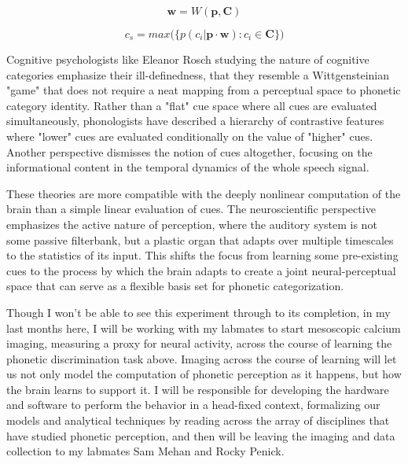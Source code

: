 \begin{equation}
\label{eqn:w}
\mathbf{w} = W(\mathbf{p}, \mathbf{C})
\end{equation}

\begin{equation}
\label{eqn:infer_2}
c_s = max\big( \big\{ p(c_i | \mathbf{p} \cdot \mathbf{w}) : c_i \in \mathbf{C} \big\}\big)
\end{equation}

Cognitive psychologists like Eleanor Rosch studying the nature of cognitive categories emphasize their ill-definedness, that they resemble a Wittgensteinian "game" that does not require a neat mapping from a perceptual space to phonetic category identity\cite{roschWittgensteinCategorizationResearch1987, roschFamilyResemblancesStudies1975}. Rather than a "flat" cue space where all cues are evaluated simultaneously, phonologists have described a hierarchy of contrastive features where "lower" cues are evaluated conditionally on the value of "higher" cues\cite{Dresher2008}. Another perspective dismisses the notion of cues altogether, focusing on the informational content in the temporal dynamics of the whole speech signal\cite{kluenderLongstandingProblemsSpeech2019}.

These theories are more compatible with the deeply nonlinear computation of the brain than a simple linear evaluation of cues. The neuroscientific perspective emphasizes the active nature of perception, where the auditory system is not some passive filterbank, but a plastic organ that adapts over multiple timescales to the statistics of its input\cite{angeloniContextualModulationSound2018, holtTemporallyNonadjacentNonlinguistic2005}. This shifts the focus from learning some pre-existing cues to the process by which the brain adapts to create a joint neural-perceptual space that can serve as a flexible basis set for phonetic categorization. 

\begin{todo}
Though I won't be able to see this experiment through to its completion, in my last months here, I will be working with my labmates to start mesoscopic calcium imaging, measuring a proxy for neural activity, across the course of learning the phonetic discrimination task above. Imaging across the course of learning will let us not only model the computation of phonetic perception as it happens, but how the brain learns to support it. I will be responsible for developing the hardware and software to perform the behavior in a head-fixed context, formalizing our models and analytical techniques by reading across the array of disciplines that have studied phonetic perception, and then will be leaving the imaging and data collection to my labmates Sam Mehan and Rocky Penick.
\end{todo}
